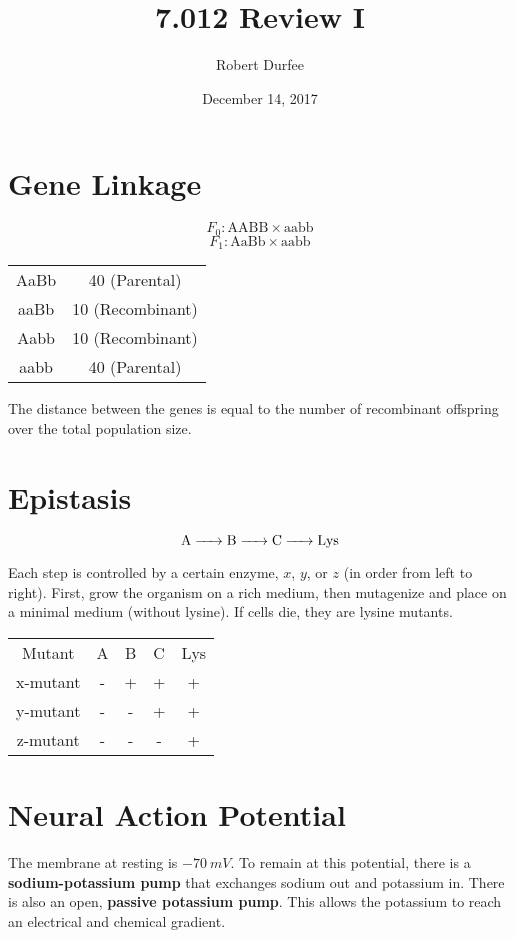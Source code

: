 \documentclass{article}
\title{ 7.012 Review I }
\author{ Robert Durfee }
\date{ December 14, 2017 }
\begin{document}
\maketitle

\section{ Gene Linkage }

$$ F_{0}: \mathrm{AABB \times aabb} $$
$$ F_{1}: \mathrm{AaBb \times aabb} $$

\begin{center}
  \begin{tabular}{ c c }
    AaBb & 40 (Parental)\\
    aaBb & 10 (Recombinant)\\
    Aabb & 10 (Recombinant)\\
    aabb & 40 (Parental)\\
  \end{tabular}
\end{center}

The distance between the genes is equal to the number of recombinant offspring
over the total population size.

\section{Epistasis}

$$ \ce{A -> B -> C -> Lys} $$

Each step is controlled by a certain enzyme, $x$, $y$, or $z$ (in order from
left to right). First, grow the organism on a rich medium, then mutagenize and
place on a minimal medium (without lysine). If cells die, they are lysine
mutants.

\begin{center}
  \begin{tabular}{ c c c c c }
    Mutant & A & B & C & Lys \\
    x-mutant & - & + & + & + \\
    y-mutant & - & - & + & + \\
    z-mutant & - & - & - & +
  \end{tabular}
\end{center}

\section{Neural Action Potential}

The membrane at resting is $-70\ \si{ mV }$. To remain at this potential, there
is a \textbf{sodium-potassium pump} that exchanges sodium out and potassium in.
There is also an open, \textbf{passive potassium pump}. This allows the
potassium to reach an electrical and chemical gradient.
\end{document}
